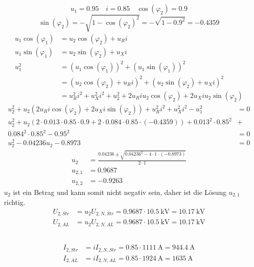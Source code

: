 \documentclass[11pt,a4paper]{scrartcl}
\newcommand{\mybr}[1]{\left(#1\right)}
\newcommand{\0}{_{\mybr{0}}}
\newcommand{\1}{_{\mybr{1}}}
\newcommand{\2}{_{\mybr{2}}}
\newcommand{\USS}{U_{2,Str}}
\newcommand{\USA}{U_{2,AL}}
\newcommand{\ISS}{I_{2,Str}}
\newcommand{\ISA}{I_{2,AL}}
\newcommand{\USNS}{U_{2,N,Str}}
\newcommand{\USNA}{U_{2,N,AL}}
\newcommand{\ISNS}{I_{2,N,Str}}
\newcommand{\ISNA}{I_{2,N,AL}}
\newcommand{\ce}{\cos\mybr{\varphi_1}}
\newcommand{\se}{\sin\mybr{\varphi_1}}
\newcommand{\cz}{\cos\mybr{\varphi_2}}
\newcommand{\sz}{\sin\mybr{\varphi_2}}
\begin{document}
\section{}
\subsection{}
\begin{equation}
u_1=\num{0.95}\quad i=\num{0.85}\quad \cos\mybr{\varphi_2}=0.9
\end{equation}
\begin{equation}
\sin\mybr{\varphi_2}=-\sqrt{1-\cz^2}=-\sqrt{1-\num{0.9}^2}=\num{-0.4359}
\end{equation}
\begin{align}
u_1\ce&=u_2\cz+u_R i\\
u_1\se&=u_2\sz+u_X i\\
u_1^2&=\mybr{u_1\ce}^2+\mybr{u_1\se}^2\\
&=\mybr{u_2\cz+u_R i}^2+\mybr{u_2\sz+u_X i}^2\\
&=u_R^2i^2+u_X^2i^2+u_2^2+2u_R i u_2 \cz+2u_X i u_2\sz
\end{align}
\begin{align}
u_2^2+u_2\mybr{2u_R i \cz+2u_X i \sz}+u_R^2 i^2 + u_X^2 i^2 - u_1^2 &= 0\\
u_2^2+u_2\mybr{2\cdot\num{0.013}\cdot\num{0.85}\cdot\num{0.9}+2\cdot\num{0.084}\cdot\num{0.85}\cdot\mybr{\num{-0.4359}}}+\num{0.013}^2\cdot\num{0.85}^2&+\\
\num{0.084}^2\cdot\num{0.85}^2-\num{0.95}^2 &=0\nonumber\\
u_2^2-\num{0.04236}u_2-\num{0.8973}&=0
\end{align}
\begin{align}
u_2&=\frac{\num{0.04236}\pm\sqrt{\num{0.04236}^2-4\cdot1\cdot\mybr{\num{-0.8973}}}}{2\cdot1}\\
u_{2,1}&=\num{0.9687}\\
u_{2,2}&=\num{-0.9263}
\end{align}
$u_2$ ist ein Betrag und kann somit nicht negativ sein, daher ist die Lösung $u_{2,1}$ richtig.
\begin{align}
\USS&=u_2\USNS=\num{0.9687}\cdot\SI{10.5}{\kilo\volt}=\SI{10.17}{\kilo\volt}\\
\USA&=u_2\USNA=\num{0.9687}\cdot\SI{10.5}{\kilo\volt}=\SI{10.17}{\kilo\volt}
\end{align}

\subsection{}
\begin{align}
\ISS&=i\ISNS=\num{0.85}\cdot\SI{1111}{\ampere}=\SI{944.4}{\ampere}\\
\ISA&=i\ISNA=\num{0.85}\cdot\SI{1924}{\ampere}=\SI{1635}{\ampere}\\
\end{align}
\end{document}
